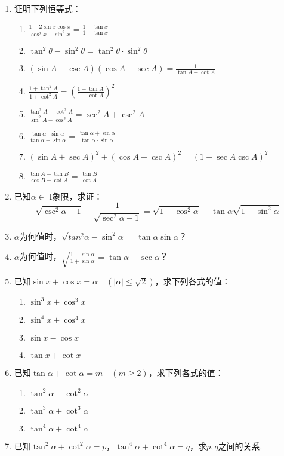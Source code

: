 \begin{enumerate}
    \item 证明下列恒等式：
\begin{enumerate}[(1)]
    \item $\frac{1-2\sin x \cos x}{\cos^2 x-\sin^2 x}=\frac{1-\tan x}{1+\tan x}$
    \item $\tan^2\theta-\sin^2\theta=\tan^2\theta\cdot \sin^2\theta$
    \item $(\sin A-\csc A)(\cos A-\sec A)=\frac{1}{\tan A+\cot A}$
    \item $\frac{1+\tan^2 A}{1+\cot^2 A}=\left(\frac{1-\tan A}{1-\cot A}\right)^2$
    \item $\frac{\tan^2 A-\cot^2 A}{\sin^2 A-\cos^2 A}=\sec^2 A+\csc^2 A$
    \item $\frac{\tan\alpha\cdot \sin\alpha}{\tan\alpha-\sin\alpha}=\frac{\tan\alpha+\sin\alpha}{\tan\alpha\cdot \sin\alpha}$
    \item $(\sin A+\sec A)^2+(\cos A+\csc A)^2=(1+\sec A\csc A)^2$
    \item $\frac{\tan A-\tan B}{\cot B-\cot A}=\frac{\tan B}{\cot A}$
\end{enumerate}

\item 已知$\alpha\in$ I象限，求证：
\[\sqrt{\csc^2 \alpha-1}-\frac{1}{\sqrt{\sec^2\alpha-1}}=\sqrt{1-\cos^2\alpha}-\tan\alpha\sqrt{1-\sin^2\alpha}\]

\item $\alpha$为何值时，$\sqrt{tan^2\alpha-\sin^2\alpha}=\tan\alpha \sin\alpha$？
\item $\alpha$为何值时，$\sqrt{\frac{1-\sin\alpha}{1+\sin\alpha}}=\tan\alpha-\sec\alpha$？
\item 已知$\sin x+\cos x=\alpha\quad (|\alpha|\le \sqrt{2})$，求下列各式的值：
\begin{multicols}{2}
\begin{enumerate}[(1)]
    \item $\sin^3 x+\cos^3 x$
    \item $\sin^4 x+\cos^4 x$
    \item $\sin x-\cos x$
    \item $\tan x+\cot x$
\end{enumerate}
\end{multicols}
\item 已知$\tan\alpha+\cot\alpha=m\quad (m\ge 2)$，求下列各式的值：
\begin{multicols}{3}
\begin{enumerate}[(1)]
\item $\tan^2\alpha-\cot^2\alpha$
\item $\tan^3\alpha+\cot^3\alpha$
\item $\tan^4\alpha+\cot^4\alpha$
\end{enumerate}
\end{multicols}

\item 已知$\tan^2\alpha+\cot^2\alpha=p$，$\tan^4\alpha+\cot^4\alpha=q$，求$p,q$之间的关系.
\end{enumerate}

